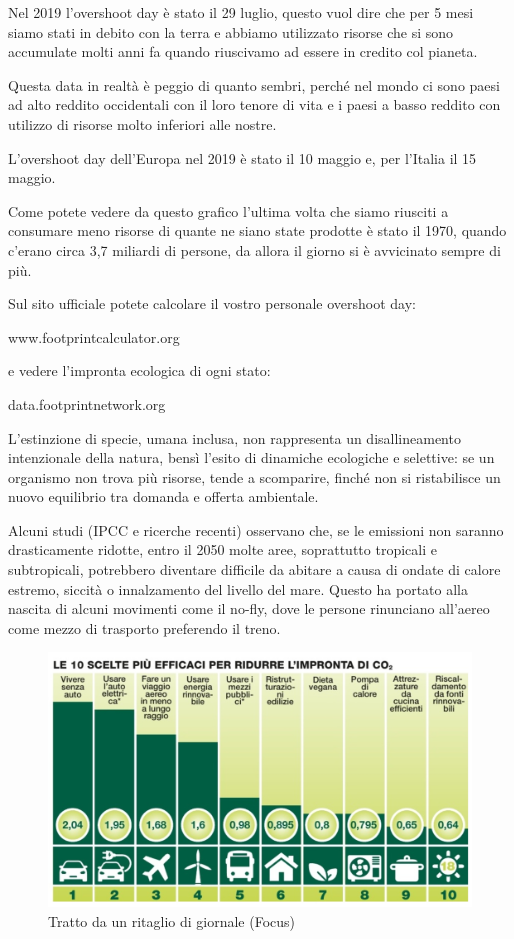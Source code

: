 \documentclass[12pt]{book} %
\begin{document}
Nel 2019 l'overshoot day è stato il 29 luglio, questo vuol dire che per 5 mesi siamo stati in
debito con la terra e abbiamo utilizzato risorse che si sono accumulate molti anni fa quando riuscivamo ad essere in
credito col pianeta.

Questa data in realtà è peggio di quanto sembri, perché nel mondo ci sono paesi ad alto reddito occidentali con il loro tenore di vita e i
paesi a basso reddito con utilizzo di risorse molto inferiori alle nostre.

L'overshoot day dell'Europa nel 2019 è stato il 10 maggio e, per l'Italia il
15 maggio.

Come potete vedere da questo grafico l'ultima volta che siamo riusciti a consumare meno risorse di
quante ne siano state prodotte è stato il 1970, quando c'erano circa 3,7 miliardi di persone, da
allora il giorno si è avvicinato sempre di
più.

Sul sito ufficiale potete calcolare il vostro personale overshoot day:

www.footprintcalculator.org 

e vedere l'impronta ecologica di ogni stato:

data.footprintnetwork.org

L’estinzione di specie, umana inclusa, non rappresenta un disallineamento intenzionale della natura, bensì l’esito di dinamiche ecologiche e selettive: se un organismo non trova più risorse, tende a scomparire, finché non si ristabilisce un nuovo equilibrio tra domanda e offerta ambientale.

Alcuni studi (IPCC e ricerche recenti) osservano che, se le emissioni non saranno drasticamente ridotte, entro il 2050 molte aree, soprattutto tropicali e subtropicali, potrebbero diventare difficile da abitare a causa di ondate di calore estremo, siccità o innalzamento del livello del mare. Questo ha portato alla nascita di alcuni movimenti come il no-fly, dove le persone rinunciano all'aereo come mezzo di trasporto preferendo il treno.

\needspace{4cm}
\begin{figure}[H]
  \centering
  \includegraphics[width=0.95\linewidth]{images/Libro-img019.jpg}
  \caption{Tratto da un ritaglio di giornale (Focus)}
\end{figure}
\end{document}
